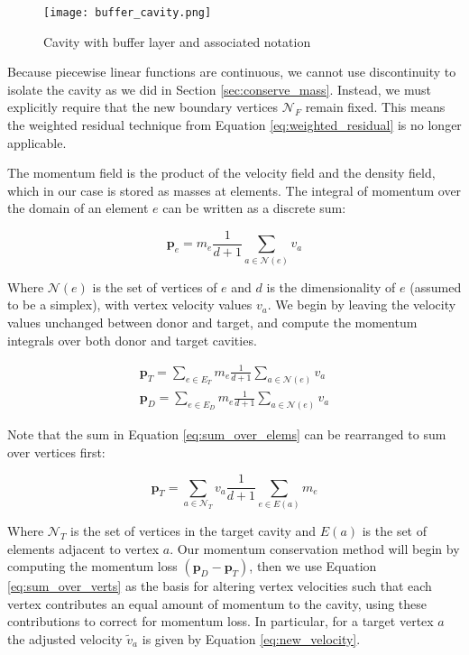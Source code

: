 \begin{figure}
\begin{center}
\texttt{[image: buffer\_cavity.png]}
\caption{Cavity with buffer layer and associated notation}
\label{fig:buffer_cavity}
\end{center}
\end{figure}

Because piecewise linear functions are continuous, we cannot
use discontinuity to isolate the cavity as we did in Section
\ref{sec:conserve_mass}.
Instead, we must explicitly require that the new boundary vertices
$\mathcal{N}_F$ remain fixed.
This means the weighted residual technique from Equation
\ref{eq:weighted_residual} is no longer applicable.

The momentum field is the product of the velocity field
and the density field, which in our case is stored as masses
at elements.
The integral of momentum over the domain of an element $e$
can be written as a discrete sum:

\begin{equation} \label{eq:element_momentum}
\mathbf{p}_{e} = m_e \frac1{d+1}\sum_{a \in \mathcal{N}(e)} v_a
\end{equation}

Where $\mathcal{N}(e)$ is the set of vertices of $e$ and
$d$ is the dimensionality of $e$ (assumed to be a simplex),
with vertex velocity values $v_a$.
We begin by leaving the velocity values unchanged between
donor and target, and compute the momentum integrals
over both donor and target cavities.

\begin{gather} \label{eq:sum_over_elems}
\mathbf{p}_T = \sum_{e \in E_T} m_e \frac1{d+1}\sum_{a \in \mathcal{N}(e)} v_a \\
\mathbf{p}_D = \sum_{e \in E_D} m_e \frac1{d+1}\sum_{a \in \mathcal{N}(e)} v_a
\end{gather}

Note that the sum in Equation \ref{eq:sum_over_elems} can be rearranged
to sum over vertices first:

\begin{equation} \label{eq:sum_over_verts}
\mathbf{p}_T = \sum_{a \in \mathcal{N}_T} v_a \frac1{d+1} \sum_{e \in E(a)} m_e
\end{equation}

Where $\mathcal{N}_T$ is the set of vertices in the target cavity and
$E(a)$ is the set of elements adjacent to vertex $a$.
Our momentum conservation method will begin by computing the
momentum loss $(\mathbf{p}_D - \mathbf{p}_T)$, then
we use Equation \ref{eq:sum_over_verts} as the basis for
altering vertex velocities such that each vertex contributes
an equal amount of momentum to the cavity, using these
contributions to correct for momentum loss.
In particular, for a target vertex $a$ the adjusted velocity
$\tilde{v}_a$ is given by Equation \ref{eq:new_velocity}.

